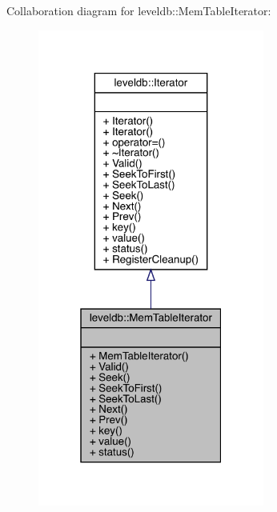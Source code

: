 Collaboration diagram for leveldb\+::Mem\+Table\+Iterator\+:
\nopagebreak
\begin{figure}[H]
\begin{center}
\leavevmode
\includegraphics[width=211pt]{classleveldb_1_1_mem_table_iterator__coll__graph}
\end{center}
\end{figure}
